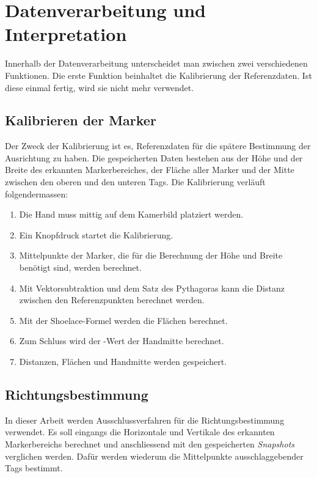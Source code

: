 \section{Datenverarbeitung und Interpretation}
Innerhalb der Datenverarbeitung unterscheidet man zwischen zwei verschiedenen Funktionen.
Die erste Funktion beinhaltet die Kalibrierung der Referenzdaten.
Ist diese einmal fertig, wird sie nicht mehr verwendet.

\subsection{Kalibrieren der Marker}
Der Zweck der Kalibrierung ist es, Referenzdaten für die spätere Bestimmung der Ausrichtung zu haben.\footnotemark{}
Die gespeicherten Daten bestehen aus der Höhe und der Breite des erkannten Markerbereiches, der Fläche aller Marker und der Mitte zwischen den oberen und den unteren Tags.
Die Kalibrierung verläuft folgendermassen:

\begin{enumerate}
    \item Die Hand muss mittig auf dem Kamerbild platziert werden.
    \item Ein Knopfdruck startet die Kalibrierung.
    \item Mittelpunkte der Marker, die für die Berechnung der Höhe und Breite benötigt sind, werden berechnet.
    \item Mit Vektorsubtraktion und dem Satz des Pythagoras kann die Distanz zwischen den Referenzpunkten berechnet werden.
    \item Mit der Shoelace-Formel werden die Flächen berechnet.
    \item Zum Schluss wird der -Wert der Handmitte berechnet.
    \item Distanzen, Flächen und Handmitte werden gespeichert.
\end{enumerate}

\subsection{Richtungsbestimmung}
In dieser Arbeit werden Ausschlussverfahren für die Richtungsbestimmung verwendet.
Es soll eingangs die Horizontale und Vertikale des erkannten Markerbereichs berechnet und anschliessend mit den gespeicherten \textit{Snapshots} verglichen werden.
Dafür werden wiederum die Mittelpunkte ausschlaggebender Tags bestimmt.

